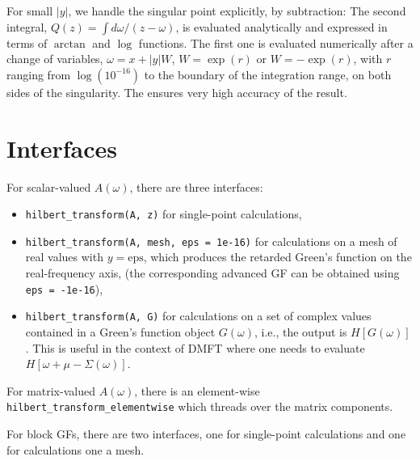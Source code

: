 \documentclass[prb,amsmath,amssymb,onecolumn,nopacs,floatfix]{revtex4}
\begin{document}
For small $|y|$, we handle the singular point explicitly, by subtraction:
%
%
The second integral, $Q(z)=\int d\omega/(z-\omega)$, is evaluated analytically and expressed
in terms of $\arctan$ and $\log$ functions. The first one is evaluated numerically after 
a change of variables, $\omega = x + |y| W$, $W=\exp(r)$ or $W=-\exp(r)$, with $r$ 
ranging from $\log(10^{-16})$ to the boundary of the integration range, 
on both sides of the singularity. The ensures very high accuracy of the result.

\section{Interfaces}

For scalar-valued $A(\omega)$, there are three interfaces:
%
\begin{itemize}
\item {\tt hilbert\_transform(A, z)} for single-point calculations,

\item {\tt hilbert\_transform(A, mesh, eps = 1e-16)} for calculations on
a mesh of real values with $y=\mathrm{eps}$, which produces the
retarded Green's function on the real-frequency axis, (the corresponding advanced
GF can be obtained using {\tt eps = -1e-16}),

\item {\tt hilbert\_transform(A, G)} for calculations on a set of 
complex values contained in a Green's function object $G(\omega)$, i.e., the
output is $H[G(\omega)]$. This is useful in the context of DMFT where
one needs to evaluate $H[\omega+\mu-\Sigma(\omega)]$.
\end{itemize}

For matrix-valued $A(\omega)$, there is an element-wise
{\tt hilbert\_transform\_elementwise} which threads over the matrix components.

For block GFs, there are two interfaces, one for single-point calculations and one for
calculations one a mesh.
\end{document}
